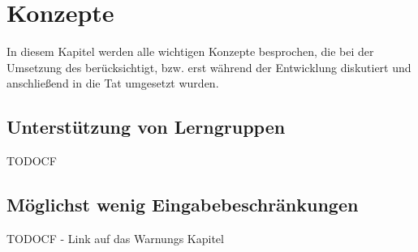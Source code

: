 

\chapter{Konzepte}\label{Concepts}

In diesem Kapitel werden alle wichtigen Konzepte besprochen, die bei der
Umsetzung des \gtitools berücksichtigt, bzw. erst während der Entwicklung
diskutiert und anschließend in die Tat umgesetzt wurden.


\section{Unterstützung von Lerngruppen}

TODOCF


\section{Möglichst wenig Eingabebeschränkungen}

TODOCF - Link auf das Warnungs Kapitel
